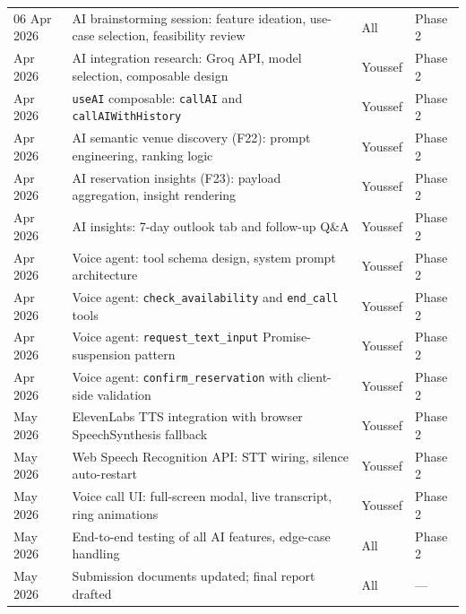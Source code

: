 \documentclass[12pt,a4paper,oneside]{report}
\begin{document}
\begin{longtable}{L{2.5cm} L{6cm} L{2.5cm} L{1.5cm}}
  06 Apr 2026 & AI brainstorming session: feature ideation, use-case selection, feasibility review & All & Phase 2 \\
   Apr 2026 & AI integration research: Groq API, model selection, composable design & Youssef & Phase 2 \\
   Apr 2026 & \texttt{useAI} composable: \texttt{callAI} and \texttt{callAIWithHistory} & Youssef & Phase 2 \\
   Apr 2026 & AI semantic venue discovery (F22): prompt engineering, ranking logic & Youssef & Phase 2 \\
   Apr 2026 & AI reservation insights (F23): payload aggregation, insight rendering & Youssef & Phase 2 \\
   Apr 2026 & AI insights: 7-day outlook tab and follow-up Q\&A & Youssef & Phase 2 \\
   Apr 2026 & Voice agent: tool schema design, system prompt architecture & Youssef & Phase 2 \\
   Apr 2026 & Voice agent: \texttt{check\_availability} and \texttt{end\_call} tools & Youssef & Phase 2 \\
   Apr 2026 & Voice agent: \texttt{request\_text\_input} Promise-suspension pattern & Youssef & Phase 2 \\
   Apr 2026 & Voice agent: \texttt{confirm\_reservation} with client-side validation & Youssef & Phase 2 \\
   May 2026 & ElevenLabs TTS integration with browser SpeechSynthesis fallback & Youssef & Phase 2 \\
   May 2026 & Web Speech Recognition API: STT wiring, silence auto-restart & Youssef & Phase 2 \\
   May 2026 & Voice call UI: full-screen modal, live transcript, ring animations & Youssef & Phase 2 \\
   May 2026 & End-to-end testing of all AI features, edge-case handling & All & Phase 2 \\
   May 2026 & Submission documents updated; final report drafted & All & --- \\

\end{longtable}
\end{document}
